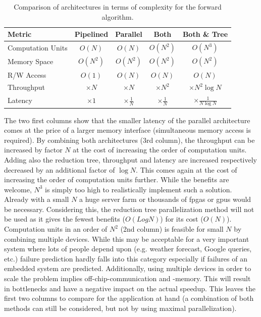 \documentclass[mscthesis]{usiinfthesis}
\begin{document}
\begin{table}
    \begin{center}
        \begin{tabular}{|l|*{4}{c|}}
            \hline
            Metric & Pipelined & Parallel & Both & Both \& Tree \\
            \hline
            \hline
            Computation Units
            & $O(N)$ & $O(N)$ & $O(N^2)$ & $O(N^3)$ \\
            \hline
            Memory Space
            & $O(N^2)$ & $O(N^2)$ & $O(N^2)$ & $O(N^2)$ \\
            \hline
            R/W Access
            & $O(1)$ & $O(N)$ & $O(N)$ & $O(N)$ \\
            \hline
            \hline
            Throughput
            & $\times N$ & $\times N$ & $\times N^2$ & $\times N^2\log N$ \\
            \hline
            Latency
            & $\times 1$ & $\times \frac{1}{N}$ & $\times \frac{1}{N}$
            & $\times \frac{1}{N\log N}$ \\
            \hline
        \end{tabular}
    \end{center}
    \caption{Comparison of architectures in terms of complexity for the forward
        algorithm.}
    \label{tab:summary_O}
\end{table}

The two first columns show that the smaller latency of the parallel
architecture comes at the price of a larger memory interface (simultaneous
memory access is required). By combining both architectures (3rd column), the
throughput can be increased by factor $N$ at the cost of increasing the order
of computation units. Adding also the reduction tree, throughput and latency
are increased respectively decreased by an additional factor of $\log N$. This
comes again at the cost of increasing the order of computation units further.
While the benefits are welcome, $N^3$ is simply too high to realistically
implement such a solution. Already with a small $N$ a huge server farm or
thousands of \glspl{fpga} or \glspl{gpu} would be necessary. Considering this,
the reduction tree parallelization method will not be used as it gives the
fewest benefits ($O(LogN)$) for its cost ($O(N)$). Computation units in an
order of $N^2$ (2nd column) is feasible for small $N$ by combining multiple
devices. While this may be acceptable for a very important system where
lots of people depend upon (e.g. weather forecast, Google queries, etc.)
failure prediction hardly falls into this category especially if failures of an
embedded system are predicted. Additionally, using multiple devices in order
to scale the problem implies off-chip-communication and -memory. This will
result in bottlenecks and have a negative impact on the actual speedup. This
leaves the first two columns to compare for the application at hand (a
combination of both methods can still be considered, but not by using maximal
parallelization).
\end{document}
